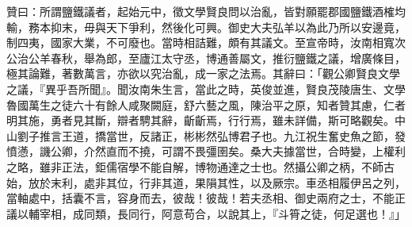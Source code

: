 \begin{pinyinscope}
贊曰：所謂鹽鐵議者，起始元中，徵文學賢良問以治亂，皆對願罷郡國鹽鐵酒榷均輸，務本抑末，毋與天下爭利，然後化可興。御史大夫弘羊以為此乃所以安邊竟，制四夷，國家大業，不可廢也。當時相詰難，頗有其議文。至宣帝時，汝南相寬次公治公羊春秋，舉為郎，至廬江太守丞，博通善屬文，推衍鹽鐵之議，增廣條目，極其論難，著數萬言，亦欲以究治亂，成一家之法焉。其辭曰：「觀公卿賢良文學之議，『異乎吾所聞』。聞汝南朱生言，當此之時，英俊並進，賢良茂陵唐生、文學魯國萬生之徒六十有餘人咸聚闕庭，舒六藝之風，陳治平之原，知者贊其慮，仁者明其施，勇者見其斷，辯者騁其辭，齗齗焉，行行焉，雖未詳備，斯可略觀矣。中山劉子推言王道，撟當世，反諸正，彬彬然弘博君子也。九江祝生奮史魚之節，發憤懣，譏公卿，介然直而不撓，可謂不畏彊圉矣。桑大夫據當世，合時變，上權利之略，雖非正法，鉅儒宿學不能自解，博物通達之士也。然攝公卿之柄，不師古始，放於末利，處非其位，行非其道，果隕其性，以及厥宗。車丞相履伊呂之列，當軸處中，括囊不言，容身而去，彼哉！彼哉！若夫丞相、御史兩府之士，不能正議以輔宰相，成同類，長同行，阿意苟合，以說其上，『斗筲之徒，何足選也！』」


\end{pinyinscope}